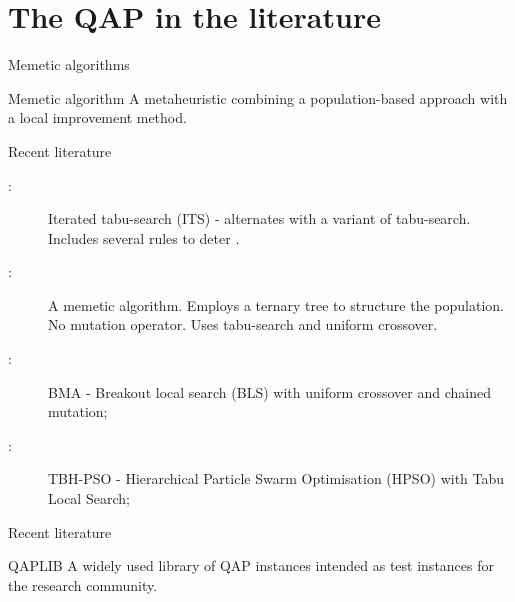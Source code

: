 \section{The QAP in the literature} {

    \begin{frame}{Memetic algorithms}
        \begin{block}{Memetic algorithm \citep{Neri:2012jr}}
            A metaheuristic combining a population-based approach with a local improvement method.
        \end{block}
    \end{frame}

    \begin{frame}{Recent literature}
        \begin{description}
            \item[\citep{Misevicius:2012dj}:] Iterated tabu-search (ITS) - alternates  with a variant of tabu-search. Includes several rules to deter .
            \item[\citep{Harris:2015kw}:] A memetic algorithm. Employs a ternary tree to structure the population. No mutation operator. Uses tabu-search and uniform crossover.
            \item[\citep{Benlic:2015gp}:] BMA - Breakout local search (BLS) with uniform crossover and chained mutation;
            \item[\citep{Helal:2015de}:] TBH-PSO - Hierarchical Particle Swarm Optimisation (HPSO) with Tabu Local Search;
        \end{description}
    \end{frame}

    \begin{frame}{Recent literature}
        \begin{block}{QAPLIB \citep{Burkard:1997ve}}
            A widely used library of QAP instances intended as test instances for the research community.
        \end{block}

        \vspace{0.8cm}


\end{frame}}
